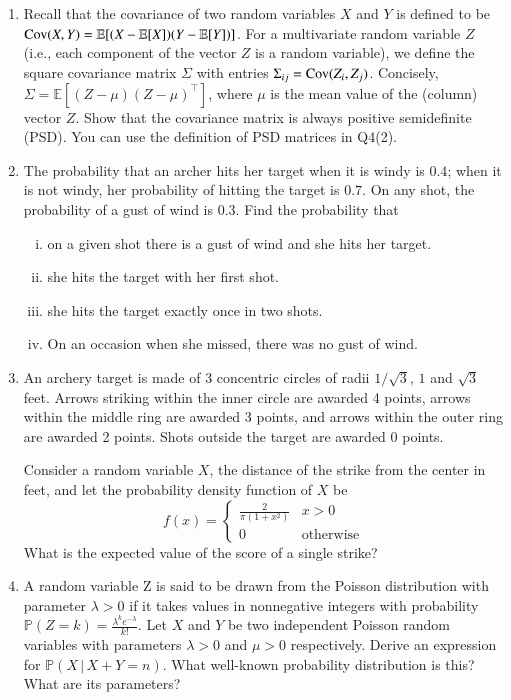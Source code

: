 \documentclass[11pt]{article}
\begin{document}
\newpage
{}

\begin{enumerate}
\item Recall that the covariance of two random variables $X$ and $Y$ is defined to be $\operatorname{Cov}(X,Y)=\mathbb{E}[(X-\mathbb{E}[X])(Y-\mathbb{E}[Y])]$. For a multivariate random variable $Z$ (i.e., each component of the vector $Z$ is a random variable), we define the square covariance matrix $\Sigma$ with entries  $\Sigma_{ij}=\operatorname{Cov}(Z_i, Z_j)$. Concisely, $\Sigma=\mathbb{E}[(Z-\mu)(Z-\mu)^\top ]$, where $\mu$ is the mean value of the (column) vector $Z$. Show that the covariance matrix is always positive semidefinite (PSD). You can use the definition of PSD matrices in Q4(2).
    
        
\item The probability that an archer hits her target when it is windy is $0.4$; when it is not windy, her probability of hitting the target is $0.7$. On any shot, the probability of a gust of wind is $0.3$. Find the probability that
\begin{enumerate}[(i)]
    \item on a given shot there is a gust of wind and she hits her target.
    \item she hits the target with her first shot.
    \item she hits the target exactly once in two shots.
    \item On an occasion when she missed, there was no gust of wind.
\end{enumerate}




\item An archery target is made of 3 concentric circles of radii $1/{\sqrt{3}}$, $1$ and $\sqrt{3}$ feet. Arrows striking within the inner circle are awarded 4 points, arrows within the middle ring are awarded 3 points, and arrows within the outer ring are awarded 2 points. Shots outside the target are awarded 0 points.

Consider a random variable $X$, the distance of the strike from the center in feet, and let the probability density function of $X$ be
\[
f(x) =
  \begin{cases}
   \frac{2}{\pi (1+x^2)} & x>0 \\
   0 &  \text{otherwise}
  \end{cases}
\]
What is the expected value of the score of a single strike?



\item A random variable Z is said to be drawn from the Poisson distribution with parameter $\lambda > 0$ if it takes values in nonnegative integers with probability $\mathbb{P}(Z = k) = \frac{\lambda^k e^{-\lambda}}{k!}$. Let $X$ and $Y$ be two independent Poisson random variables with parameters $\lambda > 0$ and $\mu > 0$ respectively. Derive an expression for $\mathbb{P}(X \,|\, X+Y=n)$. What well-known probability distribution is this? What are its parameters?


\end{enumerate}
\newpage
{}
\end{document}
